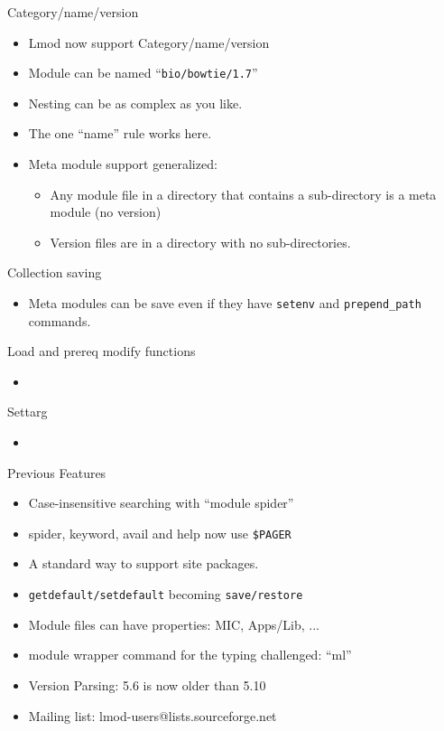 \documentclass{beamer}
\begin{document}
\begin{frame}{Category/name/version}
  \begin{itemize}
    \item Lmod now support Category/name/version
    \item Module can be named ``\texttt{bio/bowtie/1.7}''
    \item Nesting can be as complex as you like.
    \item The one ``name'' rule works here.
    \item Meta module support generalized:
      \begin{itemize}
        \item Any module file in a directory that contains a
          sub-directory is a meta module (no version)
        \item Version files are in a directory with no sub-directories.
      \end{itemize}
  \end{itemize}
\end{frame}

\begin{frame}{Collection saving}
  \begin{itemize}
    \item Meta modules can be save even if they have \texttt{setenv}
      and \texttt{prepend\_path} commands.
  \end{itemize}
\end{frame}

\begin{frame}{Load and prereq modify functions}
  \begin{itemize}
    \item 
  \end{itemize}
\end{frame}

\begin{frame}{Settarg}
  \begin{itemize}
    \item 
  \end{itemize}
\end{frame}



\begin{frame}{Previous Features}
  \begin{itemize}
    \item Case-insensitive searching with ``module spider''
    \item spider, keyword, avail and help now use \texttt{\$PAGER}
    \item A standard way to support site packages.
    \item \texttt{getdefault/setdefault} becoming \texttt{save/restore}
    \item Module files can have properties: MIC, Apps/Lib, ...
    \item module wrapper command for the typing challenged: ``ml''
    \item Version Parsing: 5.6 is now older than 5.10
    \item Mailing list: lmod-users@lists.sourceforge.net
  \end{itemize}
\end{frame}
\end{document}
